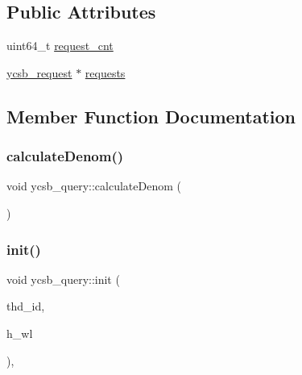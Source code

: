 \subsection*{Public Attributes}
\begin{DoxyCompactItemize}
\item 
uint64\+\_\+t \hyperlink{classycsb__query_a3626ff0e3508d4b5fe7dc2b9b485cdca}{request\+\_\+cnt}
\item 
\hyperlink{classycsb__request}{ycsb\+\_\+request} $\ast$ \hyperlink{classycsb__query_a2dfa57c2be74e3b38ccefe41e6a94eff}{requests}
\end{DoxyCompactItemize}


\subsection{Member Function Documentation}
\mbox{\label{classycsb__query_a542cbc87682e6526c2593391f55e3963}} 
\subsubsection{\texorpdfstring{calculate\+Denom()}{calculateDenom()}}
{\footnotesize\ttfamily void ycsb\+\_\+query\+::calculate\+Denom (\begin{DoxyParamCaption}{ }\end{DoxyParamCaption})\hspace{0.3cm}{\ttfamily [static]}}

\mbox{\label{classycsb__query_a05e09ce39a834921f0b83103ff5ec5e1}} 
\subsubsection{\texorpdfstring{init()}{init()}\hspace{0.1cm}{\footnotesize\ttfamily [1/2]}}
{\footnotesize\ttfamily void ycsb\+\_\+query\+::init (\begin{DoxyParamCaption}\item[{uint64\+\_\+t}]{thd\+\_\+id,  }\item[{\hyperlink{classworkload}{workload} $\ast$}]{h\+\_\+wl }\end{DoxyParamCaption})\hspace{0.3cm}{\ttfamily [inline]}, {\ttfamily [virtual]}}



